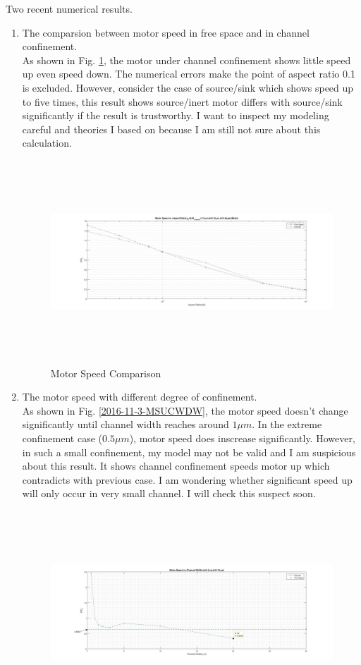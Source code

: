 \documentclass[fontsize=11pt, %
                             paper=a4, %
                             twoside, %
                             captions=tableheading,
                             index=totoc,
                             hyperref]{labbook}
\begin{document}
\begin{addmargin}[4cm]{0cm}
Two recent numerical results.
\begin{enumerate}
\item
The comparsion between motor speed in free space and in channel confinement.\\
As shown in Fig. \ref{2016-11-3-MSC}, the motor under channel confinement shows little speed up even speed down. The numerical errors make the point of aspect ratio 0.1 is excluded. However, consider the case of source/sink which shows speed up to five times, this result shows source/inert motor differs with source/sink significantly if the result is trustworthy. I want to inspect my modeling careful and theories I based on because I am still not sure about this calculation.
\begin{figure}
\centering
\includegraphics[width=\linewidth, height=3in]{2016-11-3-Channel.jpg}
\caption{Motor Speed Comparison}\label{2016-11-3-MSC}
\end{figure}
\item The motor speed with different degree of confinement.\\
As shown in Fig. \ref{2016-11-3-MSUCWDW}, the motor speed doesn't change significantly until channel width reaches around $1\mu m$. In the extreme confinement case ($0.5\mu m$), motor speed does inscrease significantly. However, in such a small confinement, my model may not be valid and I am suspicious about this result. It shows channel confinement speeds motor up which contradicts with previous case. I am wondering whether significant speed up will only occur in very small channel. I will check this suspect soon.
\begin{figure}
\centering
\includegraphics[width=\linewidth, height=3in]{2016-11-3-diff-channel-width.jpg}

\end{figure}
\end{enumerate}
\end{addmargin}
\end{document}
